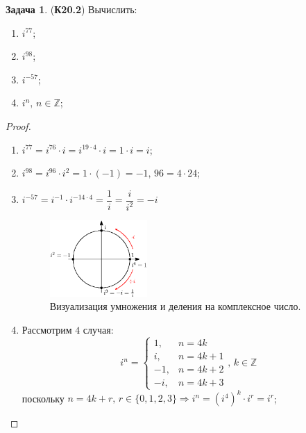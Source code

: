 \documentclass[12pt]{article}
\newcommand{\MZ}{\mathbb{Z}}
\theoremstyle{definition}
\newtheorem{problem}{Задача}
\begin{document}
\newpage
\begin{problem}(\textbf{К20.2}) 
	Вычислить:
	\begin{enumerate}[label=\arabic*)]
		\item $i^{77} $;
		\item $i^{98} $; 
		\item $i^{-57} $;
		\item $i^n, \, n \in \MZ $;
	\end{enumerate}
\end{problem}
\begin{proof}\hfill
	\begin{enumerate}[label=\arabic*)]
		\item $ i^{77} = i^{76}{\cdot}i = i^{19{\cdot}4}{\cdot}i = 1{\cdot}i = i$;
		\item $ i^{98} = i^{96}{\cdot}i^{2} = 1{\cdot}(-1) = -1, \, 96 = 4{\cdot}24$;
		\item $i^{-57} = i^{-1}{\cdot}i^{-14{\cdot}4} = \dfrac{1}{i} = \dfrac{i}{i^2} = -i $
		\begin{figure}[H]
			\centering
			\includegraphics[width=0.35\textwidth]{AL1S1_2.eps}
			\caption{Визуализация умножения и деления на комплексное число.}
			\label{1_2}
		\end{figure}
		\item Рассмотрим $4$ случая:
		$$
			i^n = 
			\begin{cases}
				1, & n = 4k \\
				i, & n = 4k + 1 \\ 
				-1, & n = 4k + 2 \\
				-i,	& n = 4k + 3 
			\end{cases}, \, k \in \MZ
		$$
		поскольку $n = 4k + r, \, r \in \{0,1,2,3\} \Rightarrow i^n = (i^4)^k{\cdot}i^r = i^r$;
	\end{enumerate}
\end{proof}
\end{document}
